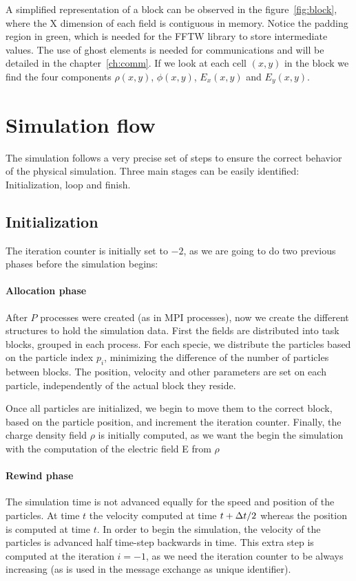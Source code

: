 A simplified representation of a block can be observed in the 
figure~\ref{fig:block}, where the X dimension of each field is contiguous in 
memory.  Notice the padding region in green, which is needed for the FFTW 
library to store intermediate values. The use of ghost elements is needed for 
communications and will be detailed in the chapter~\ref{ch:comm}. If we look at 
each cell $(x,y)$ in the block we find the four components $\rho(x,y)$, 
$\phi(x,y)$, $E_x(x,y)$ and $E_y(x,y)$.

\section{Simulation flow}

The simulation follows a very precise set of steps to ensure the correct 
behavior of the physical simulation. Three main stages can be easily identified: 
Initialization, loop and finish.

\subsection{Initialization}

The iteration counter is initially set to $-2$, as we are going to do two 
previous phases before the simulation begins:

\paragraph{Allocation phase}
After $P$ processes were created (as in MPI processes), now we create the 
different structures to hold the simulation data. First the fields are 
distributed into task blocks, grouped in each process. For each specie, we 
distribute the particles based on the particle index $p_i$, minimizing the 
difference of the number of particles between blocks. The position, velocity and 
other parameters are set on each particle, independently of the actual block 
they reside.

Once all particles are initialized, we begin to move them to the correct block, 
based on the particle position, and increment the iteration counter. Finally, 
the charge density field $\rho$ is initially computed, as we want the begin the 
simulation with the computation of the electric field E from $\rho$

\paragraph{Rewind phase} The simulation time is not advanced equally for the 
speed and position of the particles. At time $t$ the velocity computed at time 
$t + \Delta t/2$ whereas the position is computed at time $t$. In order to begin the 
simulation, the velocity of the particles is advanced half time-step backwards 
in time. This extra step is computed at the iteration $i=-1$, as we need the 
iteration counter to be always increasing (as is used in the message exchange as 
unique identifier).

